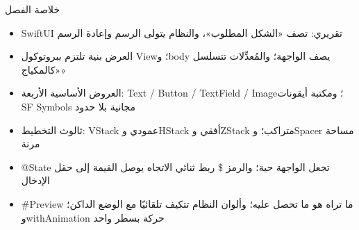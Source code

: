 \begin{tcbsummary}{خلاصة الفصل}
\begin{itemize}
  \item SwiftUI تقريري: تصف «الشكل المطلوب»، والنظام يتولى الرسم وإعادة الرسم
  \item العرض بنية تلتزم ببروتوكول View؛ وbody يصف الواجهة؛ والمُعدِّلات تتسلسل «كالمكياج»
  \item العروض الأساسية الأربعة: Text / Button / TextField / Image؛ ومكتبة أيقونات SF Symbols مجانية بلا حدود
  \item ثالوث التخطيط: VStack عمودي وHStack أفقي وZStack متراكب؛ وSpacer مساحة مرنة
  \item @State تجعل الواجهة حية؛ والرمز \$ ربط ثنائي الاتجاه يوصل القيمة إلى حقل الإدخال
  \item \#Preview ما تراه هو ما تحصل عليه؛ وألوان النظام تتكيف تلقائيًا مع الوضع الداكن؛ وwithAnimation حركة بسطر واحد
\end{itemize}

\end{tcbsummary}
